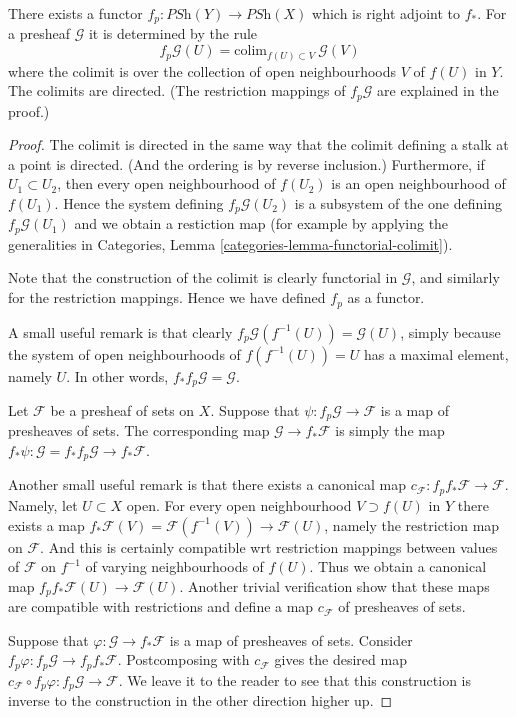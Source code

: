 \begin{lemma}
\label{lemma-pullback-presheaves}
There exists a functor
$f_p : \textit{PSh}(Y) \to \textit{PSh}(X)$
which is right adjoint to $f_*$. For a presheaf
$\mathcal{G}$ it is determined by the rule
$$
f_p\mathcal{G}(U) = \text{colim}_{f(U) \subset V}\ \mathcal{G}(V)
$$
where the colimit is over the collection of open neighbourhoods
$V$ of $f(U)$ in $Y$. The colimits are directed. (The restriction
mappings of $f_p\mathcal{G}$ are explained in the proof.)
\end{lemma}

\begin{proof}
The colimit is directed in the same way that the colimit
defining a stalk at a point is directed. (And the
ordering is by reverse inclusion.) Furthermore, if
$U_1 \subset U_2$, then every open neighbourhood of $f(U_2)$
is an open neighbourhood of $f(U_1)$. Hence the system defining
$f_p\mathcal{G}(U_2)$ is a subsystem of the one defining
$f_p\mathcal{G}(U_1)$ and we obtain a restiction map (for
example by applying the generalities in Categories,
Lemma \ref{categories-lemma-functorial-colimit}).

\medskip\noindent
Note that the construction of the colimit is clearly functorial
in $\mathcal{G}$, and similarly for the restriction mappings.
Hence we have defined $f_p$ as a functor.

\medskip\noindent
A small useful remark is that clearly $f_p\mathcal{G}(f^{-1}(U))
= \mathcal{G}(U)$, simply because the system of open neighbourhoods
of $f(f^{-1}(U)) = U$ has a maximal element, namely $U$. 
In other words, $f_* f_p\mathcal{G} = \mathcal{G}$.

\medskip\noindent
Let $\mathcal{F}$ be a presheaf of sets on $X$.
Suppose that $\psi : f_p\mathcal{G} \to \mathcal{F}$
is a map of presheaves of sets. The corresponding map
$\mathcal{G} \to f_*\mathcal{F}$ is simply the map
$f_*\psi : \mathcal{G} = f_* f_p \mathcal{G} \to f_* \mathcal{F}$.

\medskip\noindent
Another small useful remark is that there exists a
canonical map $c_{\mathcal{F}} : f_p f_* \mathcal{F} \to \mathcal{F}$.
Namely, let $U \subset X$ open. 
For every open neighbourhood $V \supset f(U)$ in $Y$
there exists a map
$f_*\mathcal{F}(V) = \mathcal{F}(f^{-1}(V))\to \mathcal{F}(U)$,
namely the restriction map on $\mathcal{F}$. And this is certainly
compatible wrt restriction mappings between values of $\mathcal{F}$
on $f^{-1}$ of varying neighbourhoods of $f(U)$. Thus we obtain
a canonical map $f_p f_* \mathcal{F}(U) \to \mathcal{F}(U)$.
Another trivial verification show that these maps are compatible
with restrictions and define a map $c_{\mathcal{F}}$
of presheaves of sets.

\medskip\noindent
Suppose that $\varphi : \mathcal{G} \to f_*\mathcal{F}$
is a map of presheaves of sets. Consider $f_p\varphi :
f_p \mathcal{G} \to f_p f_* \mathcal{F}$. 
Postcomposing with $c_{\mathcal{F}}$ gives the desired map
$c_{\mathcal{F}} \circ f_p\varphi : f_p\mathcal{G} \to \mathcal{F}$.
We leave it to the reader to see that this construction is inverse
to the construction in the other direction higher up.
\end{proof}

